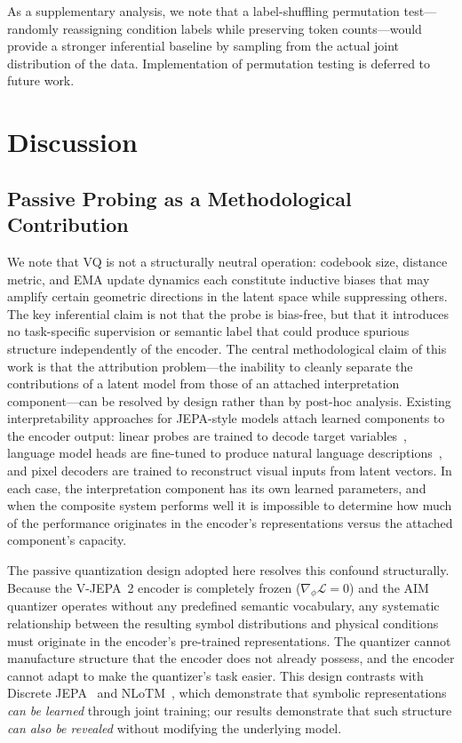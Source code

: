 \documentclass{article}
\begin{document}
As a supplementary analysis, we note that a label-shuffling permutation test—randomly reassigning condition labels while preserving token counts—would provide a stronger inferential baseline by sampling from the actual joint distribution of the data. Implementation of permutation testing is deferred to future work.

\section{Discussion}
\label{sec:discussion}

\subsection{Passive Probing as a Methodological Contribution}
We note that VQ is not a structurally neutral operation: codebook size, distance metric, and EMA update dynamics each constitute inductive biases that may amplify certain geometric directions in the latent space while suppressing others. The key inferential claim is not that the probe is bias-free, but that it introduces no task-specific supervision or semantic label that could produce spurious structure independently of the encoder.
The central methodological claim of this work is that the attribution
problem---the inability to cleanly separate the contributions of a
latent model from those of an attached interpretation component---can
be resolved by design rather than by post-hoc analysis.
Existing interpretability approaches for JEPA-style models attach
learned components to the encoder output: linear probes are trained to
decode target variables~\cite{alain2017probing}, language model heads
are fine-tuned to produce natural language
descriptions~\cite{assran2025vjepa2}, and pixel decoders are trained
to reconstruct visual inputs from latent vectors.
In each case, the interpretation component has its own learned
parameters, and when the composite system performs well it is
impossible to determine how much of the performance originates in the
encoder's representations versus the attached component's capacity.

The passive quantization design adopted here resolves this confound
structurally.
Because the V-JEPA~2 encoder is completely frozen
($\nabla_\phi \mathcal{L} = 0$) and the AIM quantizer operates
without any predefined semantic vocabulary, any systematic
relationship between the resulting symbol distributions and physical
conditions must originate in the encoder's pre-trained representations.
The quantizer cannot manufacture structure that the encoder does not
already possess, and the encoder cannot adapt to make the quantizer's
task easier.
This design contrasts with Discrete JEPA~\cite{baek2025discrete} and
NLoTM~\cite{wu2024nlotm}, which demonstrate that symbolic
representations \emph{can be learned} through joint training; our
results demonstrate that such structure \emph{can also be revealed}
without modifying the underlying model.
\end{document}
